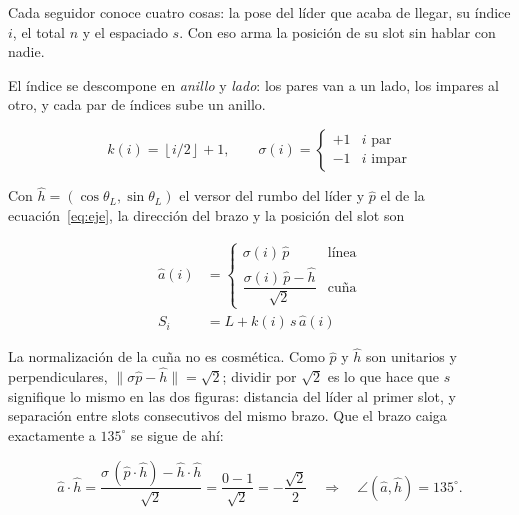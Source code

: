 \documentclass[11pt,a4paper]{article}
\theoremstyle{plain}
\newcommand{\hh}{\hat{h}}
\newcommand{\pp}{\hat{p}}
\newcommand{\aaa}{\hat{a}}
\begin{document}
Cada seguidor conoce cuatro cosas: la pose del líder que acaba de llegar, su
índice $i$, el total $n$ y el espaciado $s$. Con eso arma la posición de su
slot sin hablar con nadie.

El índice se descompone en \emph{anillo} y \emph{lado}: los pares van a un
lado, los impares al otro, y cada par de índices sube un anillo.

\begin{equation}
  k(i) = \left\lfloor i/2 \right\rfloor + 1,
  \qquad
  \sigma(i) = \begin{cases} +1 & i \text{ par}\\ -1 & i \text{ impar}\end{cases}
  \label{eq:anillo}
\end{equation}

Con $\hh = (\cos\theta_L, \sin\theta_L)$ el versor del rumbo del líder y $\pp$
el de la ecuación~\eqref{eq:eje}, la dirección del brazo y la posición del slot
son

\begin{align}
  \aaa(i) &= \begin{cases}
      \sigma(i)\,\pp & \text{línea}\\[4pt]
      \dfrac{\sigma(i)\,\pp - \hh}{\sqrt{2}} & \text{cuña}
    \end{cases}
  \label{eq:brazo}\\[6pt]
  S_i &= L + k(i)\,s\,\aaa(i)
  \label{eq:slot}
\end{align}

La normalización de la cuña no es cosmética. Como $\pp$ y $\hh$ son unitarios y
perpendiculares, $\lVert \sigma\pp - \hh \rVert = \sqrt{2}$; dividir por
$\sqrt{2}$ es lo que hace que $s$ signifique lo mismo en las dos figuras:
distancia del líder al primer slot, y separación entre slots consecutivos del
mismo brazo. Que el brazo caiga exactamente a $135^\circ$ se sigue de ahí:

\begin{equation}
  \aaa\cdot\hh
  = \frac{\sigma\,(\pp\cdot\hh) - \hh\cdot\hh}{\sqrt{2}}
  = \frac{0 - 1}{\sqrt{2}}
  = -\frac{\sqrt{2}}{2}
  \quad\Longrightarrow\quad
  \angle(\aaa,\hh) = 135^\circ .
  \label{eq:135}
\end{equation}
\end{document}
